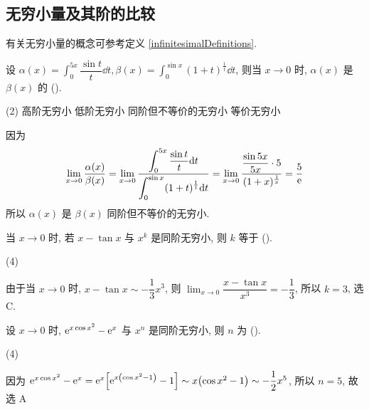 \subsection{无穷小量及其阶的比较}

有关无穷小量的概念可参考定义 \ref{infinitesimalDefinitions}.

\begin{example}[1999 数二]
    设 $\displaystyle \alpha(x)=\int_{0}^{5x} \dfrac{\sin t}{t} \dd t,\beta(x)=\int_{0}^{\sin x} (1+t)^{\frac{1}{t}} \dd t$, 则当 $x \to0$ 时, $\alpha(x)$ 是 $\beta(x)$ 的 (\quad).
    \begin{tasks}(2)
        \task 高阶无穷小
        \task 低阶无穷小
        \task 同阶但不等价的无穷小
        \task 等价无穷小
    \end{tasks}
\end{example}
\begin{solution}
    因为 $$
    \lim_{x \to 0}\dfrac{\alpha(x)}{\beta(x)}=\lim_{x \to 0}\dfrac{\displaystyle \int_{0}^{5x} \dfrac{\sin t}{t} \dd t}{\displaystyle \int_{0}^{\sin x} (1+t)^{\frac{1}{t}} \dd t}=\lim_{x \to 0}\dfrac{\dfrac{\sin 5x}{5x}\cdot 5}{(1+x)^{\frac{1}{x}}}=\dfrac{5}{\mathrm{e}}
    $$
    所以 $\alpha(x)$ 是 $\beta(x)$ 同阶但不等价的无穷小.
\end{solution}

\begin{example}[2019 数一]
    当 $x\to0$ 时, 若 $x-\tan x$ 与 $x^{k}$ 是同阶无穷小, 则 $k$ 等于 (\quad).
    \begin{tasks}(4)
    \end{tasks}
\end{example}
\begin{solution}
    由于当 $x\to0$ 时, $x-\tan x\sim-\dfrac{1}{3}x^3$, 则 $\displaystyle\lim_{x\to0}\dfrac{x-\tan x}{x^3}=-\dfrac{1}{3}$, 所以 $k=3$, 选 C.
\end{solution}

\begin{example}
    设 $x\to0$ 时, $\mathrm{e} ^{x\cos x^2}-\mathrm{e} ^{x}$ 与 $x^n$ 是同阶无穷小, 则 $n $ 为 (\quad).
    \begin{tasks}(4)
    \end{tasks}
\end{example}
\begin{solution}
    因为 $\mathrm{e} ^{x\cos x^2}-\mathrm{e} ^{x}=\mathrm{e}^x\qty[\mathrm{e} ^{x\qty(\cos x^2-1)}-1]\sim x\qty(\cos x^2-1)\sim -\dfrac{1}{2}x^5$, 所以 $n=5$, 故选 A
\end{solution}

